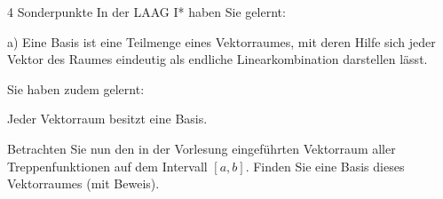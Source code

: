 \documentclass{problemset}
\begin{document}
\begin{problem}{4 Sonderpunkte}
In der LAAG I* haben Sie gelernt:

a) Eine Basis ist eine Teilmenge eines Vektorraumes, mit deren Hilfe sich jeder Vektor des Raumes eindeutig als endliche Linearkombination darstellen lässt.

Sie haben zudem gelernt:

Jeder Vektorraum besitzt eine Basis.

Betrachten Sie nun den in der Vorlesung eingeführten Vektorraum aller Treppenfunktionen auf dem Intervall $[a, b]$. Finden Sie eine Basis dieses Vektorraumes (mit Beweis).
\end{problem}
\end{document}

